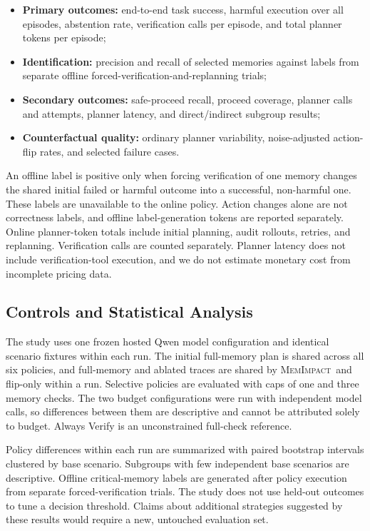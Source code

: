 \documentclass[11pt]{article}
\newcommand{\method}{\textsc{MemImpact}}
\begin{document}
\begin{itemize}
  \item \textbf{Primary outcomes:} end-to-end task success, harmful execution over all episodes, abstention rate, verification calls per episode, and total planner tokens per episode;
  \item \textbf{Identification:} precision and recall of selected memories against labels from separate offline forced-verification-and-replanning trials;
  \item \textbf{Secondary outcomes:} safe-proceed recall, proceed coverage, planner calls and attempts, planner latency, and direct/indirect subgroup results;
  \item \textbf{Counterfactual quality:} ordinary planner variability, noise-adjusted action-flip rates, and selected failure cases.
\end{itemize}
An offline label is positive only when forcing verification of one memory changes the shared initial failed or harmful outcome into a successful, non-harmful one. These labels are unavailable to the online policy. Action changes alone are not correctness labels, and offline label-generation tokens are reported separately. Online planner-token totals include initial planning, audit rollouts, retries, and replanning. Verification calls are counted separately. Planner latency does not include verification-tool execution, and we do not estimate monetary cost from incomplete pricing data.

\subsection{Controls and Statistical Analysis}

The study uses one frozen hosted Qwen model configuration and identical scenario fixtures within each run. The initial full-memory plan is shared across all six policies, and full-memory and ablated traces are shared by \method\ and flip-only within a run. Selective policies are evaluated with caps of one and three memory checks. The two budget configurations were run with independent model calls, so differences between them are descriptive and cannot be attributed solely to budget. Always Verify is an unconstrained full-check reference.

Policy differences within each run are summarized with paired bootstrap intervals clustered by base scenario. Subgroups with few independent base scenarios are descriptive. Offline critical-memory labels are generated after policy execution from separate forced-verification trials. The study does not use held-out outcomes to tune a decision threshold. Claims about additional strategies suggested by these results would require a new, untouched evaluation set.
\end{document}
